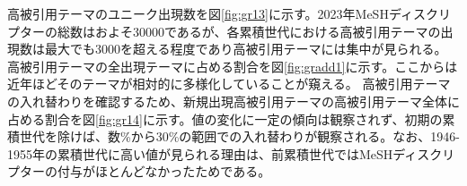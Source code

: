 高被引用テーマのユニーク出現数を図\ref{fig:gr13}に示す。2023年MeSHディスクリプターの総数はおよそ30000であるが、各累積世代における高被引用テーマの出現数は最大でも3000を超える程度であり高被引用テーマには集中が見られる。
高被引用テーマの全出現テーマに占める割合を図\ref{fig:gradd1}に示す。ここからは近年ほどそのテーマが相対的に多様化していることが窺える。
高被引用テーマの入れ替わりを確認するため、新規出現高被引用テーマの高被引用テーマ全体に占める割合を図\ref{fig:gr14}に示す。値の変化に一定の傾向は観察されず、初期の累積世代を除けば、数\%から30\%の範囲での入れ替わりが観察される。なお、1946-1955年の累積世代に高い値が見られる理由は、前累積世代ではMeSHディスクリプターの付与がほとんどなかったためである。
